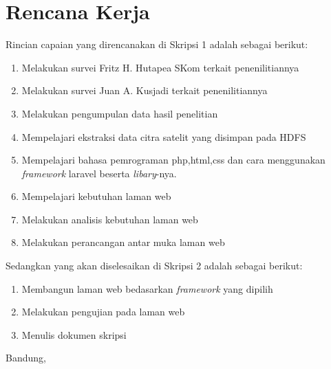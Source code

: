\documentclass[a4paper,twoside]{article}
\begin{document}
\section{Rencana Kerja}
Rincian capaian yang direncanakan di Skripsi 1 adalah sebagai berikut:
\begin{enumerate}
\item Melakukan survei Fritz H. Hutapea SKom terkait penenilitiannya
\item Melakukan survei Juan A. Kusjadi terkait penenilitiannya
\item Melakukan pengumpulan data hasil penelitian
\item Mempelajari ekstraksi data citra satelit yang disimpan pada HDFS
\item Mempelajari bahasa pemrograman php,html,css dan cara menggunakan \emph{framework} laravel beserta \emph{libary}-nya.
\item Mempelajari kebutuhan laman web
\item Melakukan analisis kebutuhan laman web
\item Melakukan perancangan antar muka laman web
\end{enumerate}

Sedangkan yang akan diselesaikan di Skripsi 2 adalah sebagai berikut:
\begin{enumerate}
\item Membangun laman web bedasarkan \emph{framework} yang dipilih
\item Melakukan pengujian pada laman web
\item Menulis dokumen skripsi
\end{enumerate}

\vspace{1cm}
\centering Bandung, \tanggal\\
\vspace{2cm} \nama \\ 
\vspace{1cm}
\end{document}
